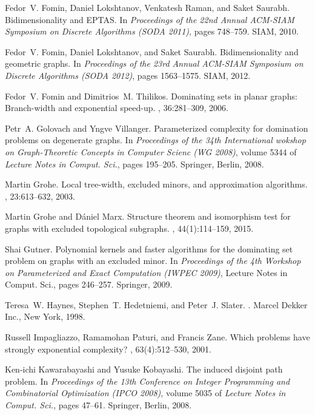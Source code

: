 \documentclass[11pt]{article}
\begin{document}
\begin{thebibliography}{10}
Fedor~V. Fomin, Daniel Lokshtanov, Venkatesh Raman, and Saket Saurabh.
\newblock Bidimensionality and {EPTAS}.
\newblock In {\em Proceedings of the 22nd Annual ACM-SIAM Symposium on Discrete
  Algorithms (SODA 2011)}, pages 748--759. SIAM, 2010.

Fedor~V. Fomin, Daniel Lokshtanov, and Saket Saurabh.
\newblock Bidimensionality and geometric graphs.
\newblock In {\em Proceedings of the 23rd Annual ACM-SIAM Symposium on Discrete
  Algorithms (SODA 2012)}, pages 1563--1575. SIAM, 2012.

Fedor~V. Fomin and Dimitrios~M. Thilikos.
\newblock Dominating sets in planar graphs: Branch-width and exponential
  speed-up.
, 36:281--309, 2006.

Petr~A. Golovach and Yngve Villanger.
\newblock Parameterized complexity for domination problems on degenerate
  graphs.
\newblock In {\em Proceedings of the 34th International wokshop on
  Graph-Theoretic Concepts in Computer Scienc (WG 2008)}, volume 5344 of {\em
  Lecture Notes in Comput. Sci.}, pages 195--205. Springer, Berlin, 2008.

Martin Grohe.
\newblock Local tree-width, excluded minors, and approximation algorithms.
, 23:613--632, 2003.

Martin Grohe and D{\'{a}}niel Marx.
\newblock Structure theorem and isomorphism test for graphs with excluded
  topological subgraphs.
, 44(1):114--159, 2015.

Shai Gutner.
\newblock Polynomial kernels and faster algorithms for the dominating set
  problem on graphs with an excluded minor.
\newblock In {\em Proceedings of the 4th Workshop on Parameterized and Exact
  Computation (IWPEC 2009)}, Lecture Notes in Comput. Sci., pages 246--257.
  Springer, 2009.

Teresa~W. Haynes, Stephen~T. Hedetniemi, and Peter~J. Slater.
.
\newblock Marcel Dekker Inc., New York, 1998.

Russell Impagliazzo, Ramamohan Paturi, and Francis Zane.
\newblock Which problems have strongly exponential complexity?
, 63(4):512--530, 2001.

Ken-ichi Kawarabayashi and Yusuke Kobayashi.
\newblock The induced disjoint path problem.
\newblock In {\em Proceedings of the 13th Conference on Integer Programming and
  Combinatorial Optimization (IPCO 2008)}, volume 5035 of {\em Lecture Notes in
  Comput. Sci.}, pages 47--61. Springer, Berlin, 2008.


\end{thebibliography}
\end{document}
